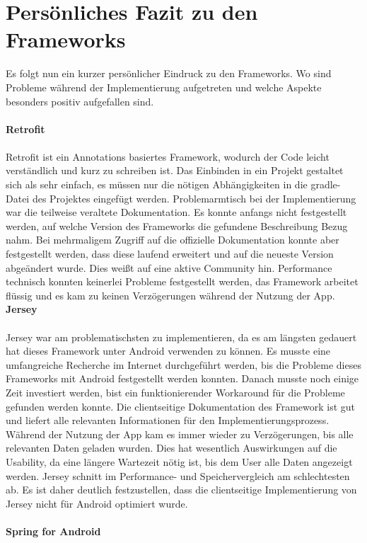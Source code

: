 \section{Persönliches Fazit zu den Frameworks}
Es folgt nun ein kurzer persönlicher Eindruck zu den Frameworks. Wo sind Probleme während der Implementierung aufgetreten und welche Aspekte besonders positiv aufgefallen sind.
\\\\
{\large \textbf{Retrofit}}\\\\
Retrofit ist ein Annotations basiertes Framework, wodurch der Code leicht verständlich und kurz zu schreiben ist. Das Einbinden in ein Projekt gestaltet sich als sehr einfach, es müssen nur die nötigen Abhängigkeiten in die gradle-Datei des Projektes eingefügt werden. Problemarmtisch bei der Implementierung war die teilweise veraltete Dokumentation. Es konnte anfangs nicht festgestellt werden, auf welche Version des Frameworks die gefundene Beschreibung Bezug nahm. Bei mehrmaligem Zugriff auf die offizielle Dokumentation konnte aber festgestellt werden, dass diese laufend erweitert und auf die neueste Version abgeändert wurde. Dies weißt auf eine aktive Community hin. Performance technisch konnten keinerlei Probleme festgestellt werden, das Framework arbeitet flüssig und es kam zu keinen Verzögerungen während der Nutzung der App.
\newpage
{\large \textbf{Jersey}}\\\\
Jersey war am problematischsten zu implementieren, da es am längsten gedauert hat dieses Framework unter Android verwenden zu können. Es musste eine umfangreiche Recherche im Internet durchgeführt werden, bis die Probleme dieses Frameworks mit Android festgestellt werden konnten. Danach musste noch einige Zeit investiert werden, bist ein funktionierender Workaround für die Probleme gefunden werden konnte. Die clientseitige Dokumentation des Framework ist gut und liefert alle relevanten Informationen für den Implementierungsprozess. Während der Nutzung der App kam es immer wieder zu Verzögerungen, bis alle relevanten Daten geladen wurden. Dies hat wesentlich Auswirkungen auf die Usability, da eine längere Wartezeit nötig ist, bis dem User alle Daten angezeigt werden. Jersey schnitt im Performance- und Speichervergleich am schlechtesten ab. Es ist daher deutlich festzustellen, dass die clientseitige Implementierung von Jersey nicht für Android optimiert wurde.
\\\\
{\large \textbf{Spring for Android}}\\\\
